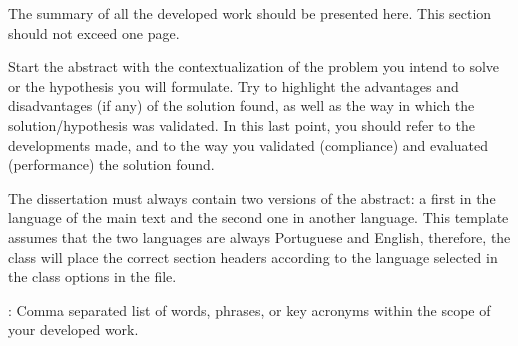 \begin{secondlangabstract}

The summary of all the developed work should be presented here. This section should not exceed one page.

Start the abstract with the contextualization of the problem you intend to solve or the hypothesis you will formulate. Try to highlight the advantages and disadvantages (if any) of the solution found, as well as the way in which the solution/hypothesis was validated. In this last point, you should refer to the developments made, and to the way you validated (compliance) and evaluated (performance) the solution found.

The dissertation must always contain two versions of the abstract: a first in the language of the main text and the second one in another language. This template assumes that the two languages are always Portuguese and English, therefore, the class will place the correct section headers according to the language selected in the class options in the  file.



\vspace*{10mm} 
\noindent
\textbf{\keywordslabel}: Comma separated list of words, phrases, or key acronyms within the scope of your developed work. 

\end{secondlangabstract}

